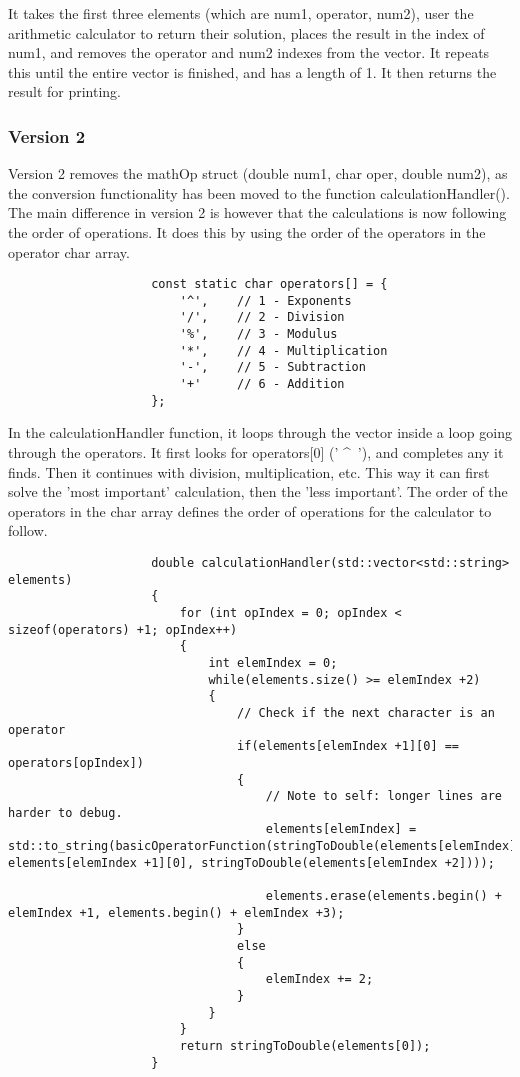 \documentclass{article}
\begin{document}
				It takes the first three elements (which are num1, operator, num2), user the arithmetic calculator to return their solution, places the result in the index of num1, and removes the operator and num2 indexes from the vector. It repeats this until the entire vector is finished, and has a length of 1. It then returns the result for printing.
			
			
			\subsubsection{Version 2}
				Version 2 removes the mathOp struct (double num1, char oper, double num2), as the conversion functionality has been moved to the function calculationHandler().
				The main difference in version 2 is however that the calculations is now following the order of operations. It does this by using the order of the operators in the operator char array.
				\begin{lstlisting}
					const static char operators[] = {
						'^',    // 1 - Exponents
						'/',    // 2 - Division
						'%',    // 3 - Modulus
						'*',    // 4 - Multiplication
						'-',    // 5 - Subtraction
						'+'     // 6 - Addition
					};
				\end{lstlisting}
				
				In the calculationHandler function, it loops through the vector inside a loop going through the operators.
				It first looks for operators[0] (' \^~'), and completes any it finds. Then it continues with division, multiplication, etc. This way it can first solve the 'most important' calculation, then the 'less important'. The order of the operators in the char array defines the order of operations for the calculator to follow.
				\begin{lstlisting}
					double calculationHandler(std::vector<std::string> elements)
					{
						for (int opIndex = 0; opIndex < sizeof(operators) +1; opIndex++)
						{
							int elemIndex = 0;
							while(elements.size() >= elemIndex +2)
							{
								// Check if the next character is an operator
								if(elements[elemIndex +1][0] == operators[opIndex])
								{
									// Note to self: longer lines are harder to debug.
									elements[elemIndex] = std::to_string(basicOperatorFunction(stringToDouble(elements[elemIndex]), elements[elemIndex +1][0], stringToDouble(elements[elemIndex +2])));
									
									elements.erase(elements.begin() + elemIndex +1, elements.begin() + elemIndex +3);
								}
								else
								{
									elemIndex += 2;
								}
							}
						}
						return stringToDouble(elements[0]);
					}
				\end{lstlisting}
		
\end{document}
